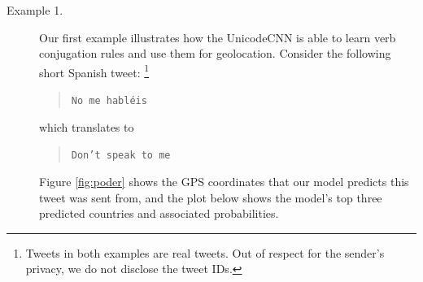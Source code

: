 \documentclass[sigconf,anonymous,review]{acmart}
\newcommand{\str}[1]{\texttt{#1}}
\begin{document}
\begin{description}
\item[Example 1.]
    Our first example illustrates how the UnicodeCNN is able to learn verb conjugation rules and use them for geolocation.
    Consider the following short Spanish tweet:%
    \footnote{Tweets in both examples are real tweets.  Out of respect for the sender's privacy, we do not disclose the tweet IDs.}
    \begin{quote}
        \str{No me habl\'eis}
    \end{quote}
    which translates to
    \begin{quote}
        \str{Don't speak to me}
    \end{quote}
Figure \ref{fig:poder} shows the GPS coordinates that our model predicts this tweet was sent from,
and the plot below shows the model's top three predicted countries and associated probabilities.

\noindent


\begin{figure}


\end{figure}
\end{description}
\end{document}
